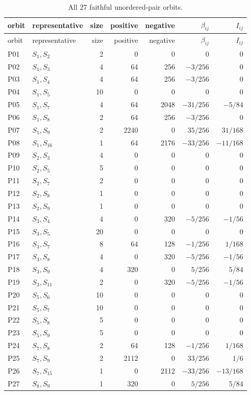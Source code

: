 \documentclass[10pt]{article}
\begin{document}
{\small
\renewcommand{\arraystretch}{0.94}
\begin{longtable}{@{}llrrrrr@{}}
\caption{All 27 faithful unordered-pair orbits.}\label{tab:orbits}\\
\toprule
orbit & representative & size & positive & negative & $\beta_{ij}$ & $I_{ij}$\\
\midrule
\endfirsthead
\toprule
orbit & representative & size & positive & negative & $\beta_{ij}$ & $I_{ij}$\\
\midrule
\endhead
P01 & $S_1,S_2$ & 2 & 0 & 0 & 0 & 0\\
P02 & $S_1,S_3$ & 4 & 64 & 256 & $-3/256$ & 0\\
P03 & $S_1,S_4$ & 4 & 64 & 256 & $-3/256$ & 0\\
P04 & $S_1,S_5$ & 10 & 0 & 0 & 0 & 0\\
P05 & $S_1,S_7$ & 4 & 64 & 2048 & $-31/256$ & $-5/84$\\
P06 & $S_1,S_8$ & 2 & 64 & 256 & $-3/256$ & 0\\
P07 & $S_1,S_9$ & 2 & 2240 & 0 & $35/256$ & $31/168$\\
P08 & $S_1,S_{16}$ & 1 & 64 & 2176 & $-33/256$ & $-11/168$\\
P09 & $S_2,S_3$ & 4 & 0 & 0 & 0 & 0\\
P10 & $S_2,S_5$ & 5 & 0 & 0 & 0 & 0\\
P11 & $S_2,S_7$ & 2 & 0 & 0 & 0 & 0\\
P12 & $S_2,S_8$ & 1 & 0 & 0 & 0 & 0\\
P13 & $S_2,S_9$ & 1 & 0 & 0 & 0 & 0\\
P14 & $S_3,S_4$ & 4 & 0 & 320 & $-5/256$ & $-1/56$\\
P15 & $S_3,S_5$ & 20 & 0 & 0 & 0 & 0\\
P16 & $S_3,S_7$ & 8 & 64 & 128 & $-1/256$ & $1/168$\\
P17 & $S_3,S_8$ & 4 & 0 & 320 & $-5/256$ & $-1/56$\\
P18 & $S_3,S_9$ & 4 & 320 & 0 & $5/256$ & $5/84$\\
P19 & $S_3,S_{11}$ & 2 & 0 & 320 & $-5/256$ & $-1/56$\\
P20 & $S_5,S_6$ & 10 & 0 & 0 & 0 & 0\\
P21 & $S_5,S_7$ & 10 & 0 & 0 & 0 & 0\\
P22 & $S_5,S_8$ & 5 & 0 & 0 & 0 & 0\\
P23 & $S_5,S_9$ & 5 & 0 & 0 & 0 & 0\\
P24 & $S_7,S_8$ & 2 & 64 & 128 & $-1/256$ & $1/168$\\
P25 & $S_7,S_9$ & 2 & 2112 & 0 & $33/256$ & $1/6$\\
P26 & $S_7,S_{15}$ & 1 & 0 & 2112 & $-33/256$ & $-13/168$\\
P27 & $S_8,S_9$ & 1 & 320 & 0 & $5/256$ & $5/84$\\
\bottomrule
\end{longtable}
}
\end{document}
